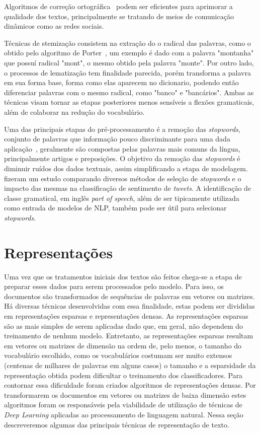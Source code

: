 Algoritmos de correção ortográfica~\cite{damerau64}\cite{navarro01} podem ser
eficientes para aprimorar a qualidade dos textos, principalmente se tratando de
meios de comunicação dinâmicos como as redes sociais.

Técnicas de stemização consistem na extração do o radical das palavras,
como o obtido pelo algoritmo de Porter~\cite{porter80}, um exemplo é dado com a
palavra "montanha" que possuí radical "mont", o mesmo obtido pela palavra
"monte".
Por outro lado, o processos de lematização tem finalidade parecida, porém
transforma a palavra em sua forma base, forma como elas aparecem no dicionario,
podendo então diferenciar palavras com o mesmo radical, como "banco" e "bancários".
Ambas as técnicas visam tornar as etapas posteriores menos sensíveis a flexões
gramaticais, além de colaborar na redução do vocabulário.

Uma das principais etapas do pré-processamento é a remoção das
\textit{stopwords}, conjunto de palavras que informação pouco discriminante
para uma dada aplicação~\cite{lo05}, geralmente são compostas pelas palavras
mais comuns da língua, principalmente artigos e preposições.
O objetivo da remoção das \textit{stopwords} é diminuir ruídos dos dados
textuais, assim simplificando a etapa de modelagem.
\citet{saif14} fizeram um estudo comparando diversos métodos de seleção de
\textit{stopwords} e o impacto das mesmas na classificação de sentimento de
\textit{tweets}.
A identificação de classe gramatical, em inglês \textit{part of speech}, além de
ser tipicamente utilizada como entrada de modelos de NLP, também pode ser útil
para selecionar \textit{stopwords}.

\section{Representações}

Uma vez que os tratamentos iniciais dos textos são feitos chega-se a etapa de
preparar esses dados para serem processados pelo modelo.
Para isso, os documentos são transformados de sequências de palavras em vetores
ou matrizes.
Há diversas técnicas desenvolvidas com essa finalidade, estas podem ser
divididas em representações esparsas e representações densas.
As representações esparsas são as mais simples de serem aplicadas dado que, em
geral, não dependem do treinamento de nenhum modelo.
Entretanto, as representações esparsas resultam em vetores ou matrizes de
dimensão na ordem de, pelo menos, o tamanho do vocabulário escolhido, como os
vocabulários costumam ser muito extensos (centenas de milhares de palavras em
alguns casos) o tamanho e a esparsidade da representação obtida podem dificultar
o treinamento dos classificadores.
Para contornar essa dificuldade foram criados algoritmos de representações
densas.
Por transformarem os documentos em vetores ou matrizes de baixa dimensão estes
algoritmos foram os responsáveis pela viabilidade de utilização de técnicas de
\textit{Deep Learning} aplicadas ao processamento de linguagem natural.
Nessa seção descreveremos algumas das principais técnicas de representação de
texto.

